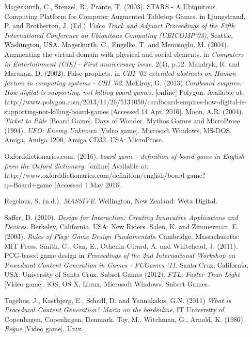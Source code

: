 \documentclass[a4paper,11pt]{article}
\begin{document}
\begin{thebibliography}{1}
Magerkurth, C., Stenzel, R., Prante, T. (2003). STARS - A Ubiquitous Computing Platform for Computer Augmented Tabletop Games. in Ljungstrand, P. and Brotherton, J. (Ed.) \textit{Video Track and Adjunct Proceedings of the Fifth
International Conference on Ubiquitous Computing (UBICOMP’03)}, Seattle, Washington, USA.
Magerkurth, C., Engelke, T. and Memisoglu, M. (2004). Augmenting the virtual domain with physical and social elements. in \textit{Computers in Entertainment (CIE) - First anniversary issue}. 2(4), p.12. 
Mandryk, R. and Maranan, D. (2002). False prophets. in \textit{CHI '02 extended abstracts on Human factors in computing systems - CHI '02}.
McElroy, G. (2013).\textit{Cardboard empires: How digital is supporting, not killing board games}. [online] Polygon. Available at: http://www.polygon.com/2013/11/26/5131050/cardboard-empires-how-digital-is-supporting-not-killing-board-games [Accessed 14 Apr. 2016].
Moon, A.R. (2004). \textit{Ticket to Ride} [Board Game]. Days of Wonder.
Mythos Games and MicroProse (1994). \textit{UFO: Enemy Unknown} [Video game]. Microsoft Windows, MS-DOS, Amiga, Amiga 1200, Amiga CD32. USA: MicroProse.

Oxforddictionaries.com. (2016). \textit{board game - definition of board game in English from the Oxford dictionary}. [online] Available at: http://www.oxforddictionaries.com/definition/english/board-game?q=Board+game [Accessed 1 May 2016].

Regelous, S. (n.d.). \textit{MASSIVE}. Wellington, New Zealand: Weta Digital.

Saffer, D. (2010). \textit{Design for Interaction: Creating Innovative Applications and Devices}. Berkeley, California, USA: New Riders.
Salen, K. and Zimmerman, E. (2003). \textit{Rules of Play: Game Design Fundamentals}. Cambridge, Massachusetts: MIT Press.
Smith, G., Gan, E., Othenin-Girard, A. and Whitehead, J. (2011). PCG-based game design in \textit{Proceedings of the 2nd International Workshop on Procedural Content Generation in Games - PCGames '11}. Santa Cruz, California, USA: University of Santa Cruz.
Subset Games (2012). \textit{FTL: Faster Than Light} [Video game]. iOS, OS X, Linux, Microsoft Windows. Subset Games.


Togelius, J., Kastbjerg, E., Schedl, D. and Yannakakis, G.N. (2011) \emph{What is Procedural Content Generation? Mario on the borderline}, IT University of Copenhagen, Copenhagen, Denmark.
Toy, M., Witchman, G., Arnold, K. (1980). \textit{Rogue} [Video game]. Unix.


\end{thebibliography}
\end{document}

